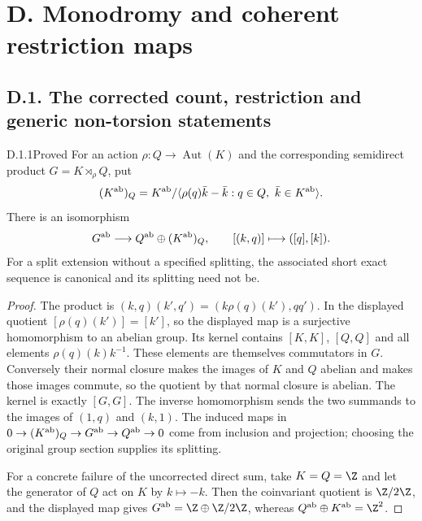 
\section{D. Monodromy and coherent restriction maps}

\subsection{D.1. The corrected count, restriction and generic non-torsion statements}


\begin{idstatement}{D.1.1}{Proved}\label{st:D.1.1}
For an action $\rho:Q\to\operatorname{Aut}(K)$ and the corresponding
semidirect product $G=K\rtimes_\rho Q$, put
\[
(K^{\rm ab})_Q=K^{\rm ab}/
\langle\rho(q)\bar k-\bar k:q\in Q,\ \bar k\in K^{\rm ab}\rangle.
\]
There is an isomorphism
\[
G^{\rm ab}\longrightarrow Q^{\rm ab}\oplus(K^{\rm ab})_Q,
\qquad [(k,q)]\longmapsto([q],[k]).
\]
For a split extension without a specified splitting, the associated
short exact sequence is canonical and its splitting need not be.
\end{idstatement}
\begin{proof}
The product is $(k,q)(k',q')=(k\rho(q)(k'),qq')$.
In the displayed quotient $[\rho(q)(k')]=[k']$, so the displayed map
is a surjective homomorphism to an abelian group. Its kernel contains
$[K,K]$, $[Q,Q]$ and all elements $\rho(q)(k)k^{-1}$.
These elements are themselves commutators in $G$. Conversely their
normal closure makes the images of $K$ and $Q$ abelian and makes
those images commute, so the quotient by that normal closure is
abelian. The kernel is exactly $[G,G]$. The inverse homomorphism
sends the two summands to the images of $(1,q)$ and $(k,1)$.
The induced maps in
$0\to(K^{\rm ab})_Q\to G^{\rm ab}\to Q^{\rm ab}\to0$
come from inclusion and projection; choosing the original group
section supplies its splitting.

For a concrete failure of the uncorrected direct sum, take
$K=Q=\Z$ and let the generator of $Q$ act on $K$ by $k\mapsto-k$.
Then the coinvariant quotient is $\Z/2\Z$, and the displayed map
gives $G^{\rm ab}=\Z\oplus\Z/2\Z$, whereas
$Q^{\rm ab}\oplus K^{\rm ab}=\Z^2$.
\end{proof}



